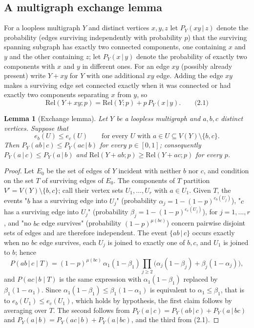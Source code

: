 \documentclass[
  11pt,
]{article}
\newtheorem{lemma}[theorem]{Lemma}
\theoremstyle{definition}
\theoremstyle{remark}
\begin{document}
\subsection{A multigraph exchange
lemma}\label{a-multigraph-exchange-lemma}

For a loopless multigraph \(Y\) and distinct vertices \(x,y,z\) let
\(P_Y(xy\,|\,z)\) denote the probability (edges surviving independently
with probability \(p\)) that the surviving spanning subgraph has exactly
two connected components, one containing \(x\) and \(y\) and the other
containing \(z\); let \(P_Y(x\,|\,y)\) denote the probability of exactly
two components with \(x\) and \(y\) in different ones. For an edge
\(xy\) (possibly already present) write \(Y+xy\) for \(Y\) with one
additional \(xy\) edge. Adding the edge \(xy\) makes a surviving edge
set connected exactly when it was connected or had exactly two
components separating \(x\) from \(y\), so
\[\mathrm{Rel}(Y+xy;p)=\mathrm{Rel}(Y;p)+p\,P_Y(x\,|\,y).\qquad\text{(2.1)}\]

\begin{lemma}[Exchange lemma]\label{lem:exchange}
Let $Y$ be a loopless multigraph and $a,b,c$ distinct vertices. Suppose that
$$e_b(U)\le e_c(U)\qquad\text{for every }U\text{ with }a\in U\subseteq V(Y)\setminus\{b,c\}.$$
Then $P_Y(ab\,|\,c)\le P_Y(ac\,|\,b)$ for every $p\in[0,1]$; consequently $P_Y(a\,|\,c)\le P_Y(a\,|\,b)$ and $\mathrm{Rel}(Y+ab;p)\ge\mathrm{Rel}(Y+ac;p)$ for every $p$.
\end{lemma}

\begin{proof}
Let $E_0$ be the set of edges of $Y$ incident with neither $b$ nor $c$, and condition on the set $T$ of surviving edges of $E_0$. The components of $T$ partition $V'=V(Y)\setminus\{b,c\}$; call their vertex sets $U_1,\dots,U_r$ with $a\in U_1$. Given $T$, the events "$b$ has a surviving edge into $U_j$" (probability $\alpha_j=1-(1-p)^{e_b(U_j)}$), "$c$ has a surviving edge into $U_j$" (probability $\beta_j=1-(1-p)^{e_c(U_j)}$), for $j=1,\dots,r$, and "no $bc$ edge survives" (probability $(1-p)^{\mu(bc)}$) concern pairwise disjoint sets of edges and are therefore independent. The event $\{ab\,|\,c\}$ occurs exactly when no $bc$ edge survives, each $U_j$ is joined to exactly one of $b,c$, and $U_1$ is joined to $b$; hence
$$P(ab\,|\,c\mid T)=(1-p)^{\mu(bc)}\,\alpha_1(1-\beta_1)\prod_{j\ge2}\big(\alpha_j(1-\beta_j)+\beta_j(1-\alpha_j)\big),$$
and $P(ac\,|\,b\mid T)$ is the same expression with $\alpha_1(1-\beta_1)$ replaced by $\beta_1(1-\alpha_1)$. Since $\alpha_1(1-\beta_1)\le\beta_1(1-\alpha_1)$ is equivalent to $\alpha_1\le\beta_1$, that is to $e_b(U_1)\le e_c(U_1)$, which holds by hypothesis, the first claim follows by averaging over $T$. The second follows from $P_Y(a\,|\,c)=P_Y(ab\,|\,c)+P_Y(a\,|\,bc)$ and $P_Y(a\,|\,b)=P_Y(ac\,|\,b)+P_Y(a\,|\,bc)$, and the third from (2.1).
\end{proof}
\end{document}

